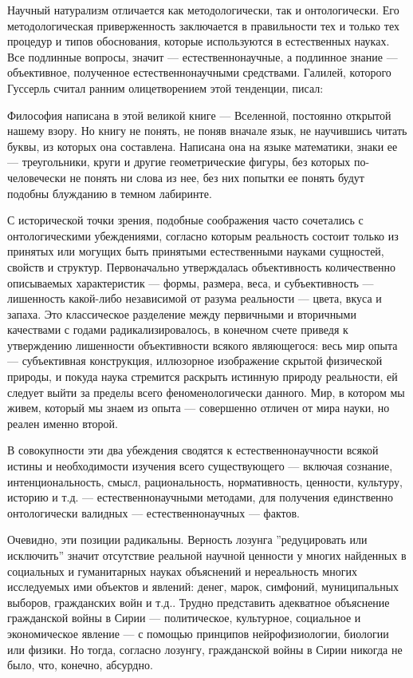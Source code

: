 \documentclass[11pt]{book}
\begin{document}
Научный натурализм отличается как методологически, так и онтологически. Его методологическая приверженность заключается в правильности тех и только тех процедур и типов обоснования, которые используются в естественных науках. Все подлинные вопросы, значит --- естественнонаучные, а подлинное знание --- объективное, полученное естественнонаучными средствами. Галилей, которого Гуссерль считал ранним олицетворением этой тенденции, писал:

\smallskip
{}\relax
{}\relax

Философия написана в этой великой книге --- Вселенной, постоянно открытой нашему взору. Но книгу не понять, не поняв вначале язык, не научившись читать буквы, из которых она составлена. Написана она на языке математики, знаки ее --- треугольники, круги и другие геометрические фигуры, без которых по-человечески не понять ни слова из нее, без них попытки ее понять будут подобны блужданию в темном лабиринте.

\relax
{}\relax
\smallskip

С исторической точки зрения, подобные соображения часто сочетались с онтологическими убеждениями, согласно которым реальность состоит только из принятых или могущих быть принятыми естественными науками сущностей, свойств и структур. Первоначально утверждалась объективность количественно описываемых характеристик --- формы, размера, веса, и субъективность --- лишенность какой-либо независимой от разума реальности --- цвета, вкуса и запаха. Это классическое разделение между первичными и вторичными качествами с годами радикализировалось, в конечном счете приведя к утверждению лишенности объективности всякого являющегося: весь мир опыта --- субъективная конструкция, иллюзорное изображение скрытой физической природы, и покуда наука стремится раскрыть истинную природу реальности, ей следует выйти за пределы всего феноменологически данного. Мир, в котором мы живем, который мы знаем из опыта --- совершенно отличен от мира науки, но реален именно второй.

В совокупности эти два убеждения сводятся к естественнонаучности всякой истины и необходимости изучения всего существующего --- включая сознание, интенциональность, смысл, рациональность, нормативность, ценности, культуру, историю и т.д. --- естественнонаучными методами, для получения единственно онтологически валидных --- естественнонаучных --- фактов.

Очевидно, эти позиции радикальны. Верность лозунга ''редуцировать или исключить'' значит отсутствие реальной научной ценности у многих найденных в социальных и гуманитарных науках объяснений и нереальность многих исследуемых ими объектов и явлений: денег, марок, симфоний, муниципальных выборов, гражданских войн и т.д.. Трудно представить адекватное объяснение гражданской войны в Сирии --- политическое, культурное, социальное и экономическое явление --- с помощью принципов нейрофизиологии, биологии или физики. Но тогда, согласно лозунгу, гражданской войны в Сирии никогда не было, что, конечно, абсурдно.
\end{document}
